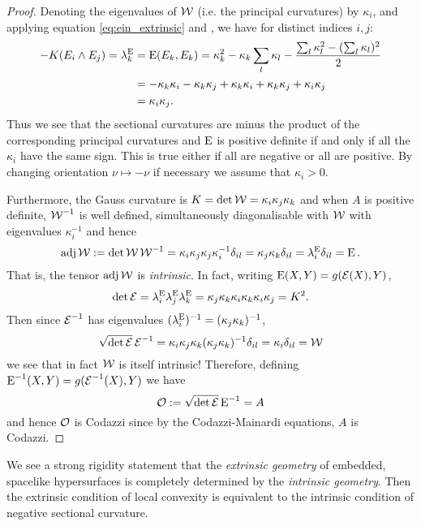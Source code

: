 \documentclass[a4paper, 12pt]{amsart}
\begin{document}
\begin{proof}
Denoting the eigenvalues of \(\operatorname{\mathcal{W}}\) (i.e. the principal curvatures) by \(\kappa_i\), and applying equation \eqref{eq:ein_extrinsic} and , we have for distinct indices \(i,j\):
\[
\begin{split}
-K(E_i \wedge E_j) = \lambda^{\operatorname{E}}_k &= \operatorname{E}(E_k, E_k) = \kappa_k^2 - \kappa_k \sum_l \kappa_l - \frac{\sum_l \kappa_l^2 - (\sum_l \kappa_l)^2}{2} \\
&= - \kappa_k \kappa_i - \kappa_k \kappa_j + \kappa_k \kappa_i + \kappa_k \kappa_j + \kappa_i \kappa_j \\
&= \kappa_i \kappa_j.
\end{split}
\]
Thus we see that the sectional curvatures are minus the product of the corresponding principal curvatures and \(\operatorname{E}\) is positive definite if and only if all the \(\kappa_i\) have the same sign. This is true either if all are negative or all are positive. By changing orientation \(\nu \mapsto -\nu\) if necessary we assume that \(\kappa_i > 0\).

Furthermore, the Gauss curvature is \(K = \det \operatorname{\mathcal{W}} = \kappa_i \kappa_j \kappa_k\) and when \(A\) is positive definite, \(\operatorname{\mathcal{W}}^{-1}\) is well defined, simultaneously diagonalisable with \(\operatorname{\mathcal{W}}\) with eigenvalues \(\kappa_i^{-1}\) and hence
\[
\operatorname{adj} \operatorname{\mathcal{W}} := \det \operatorname{\mathcal{W}} \operatorname{\mathcal{W}}^{-1} = \kappa_i \kappa_j \kappa_j \kappa_i^{-1} \delta_{il} = \kappa_j \kappa_k \delta_{il} = \lambda^{\operatorname{E}}_i \delta_{il} = \operatorname{E}.
\]
That is, the tensor \(\operatorname{adj} \operatorname{\mathcal{W}}\) is \emph{intrinsic}. In fact, writing \(\operatorname{E}(X, Y) = g(\operatorname{\mathcal{E}} (X), Y)\),
\[
\det \operatorname{\mathcal{E}} = \lambda^{\operatorname{E}}_i \lambda^{\operatorname{E}}_j \lambda^{\operatorname{E}}_k = \kappa_j \kappa_k \kappa_i \kappa_k \kappa_i \kappa_j = K^2.
\]
Then since \(\operatorname{\mathcal{E}}^{-1}\) has eigenvalues \((\lambda_i^{\operatorname{E}})^{-1} = (\kappa_j \kappa_k)^{-1}\),
\[
\sqrt{\det \operatorname{\mathcal{E}}} \operatorname{\mathcal{E}}^{-1} = \kappa_i \kappa_j \kappa_k (\kappa_j \kappa_k)^{-1} \delta_{il} = \kappa_i \delta_{il} = \operatorname{\mathcal{W}}
\]
we see that in fact \(\operatorname{\mathcal{W}}\) is itself intrinsic! Therefore, defining \(\operatorname{E}^{-1}(X, Y) = g(\operatorname{\mathcal{E}}^{-1} (X), Y)\) we have
\[
\operatorname{\mathcal{O}} := \sqrt{\det \operatorname{\mathcal{E}}} \operatorname{E}^{-1} = A
\]
and hence \(\operatorname{\mathcal{O}}\) is Codazzi since by the Codazzi-Mainardi equations, \(A\) is Codazzi.
\end{proof}

\begin{rem}
We see a strong rigidity statement that the \emph{extrinsic geometry} of embedded, spacelike hypersurfaces is completely determined by the \emph{intrinsic geometry}. Then the extrinsic condition of local convexity is equivalent to the intrinsic condition of negative sectional curvature.
\end{rem}
\end{document}
